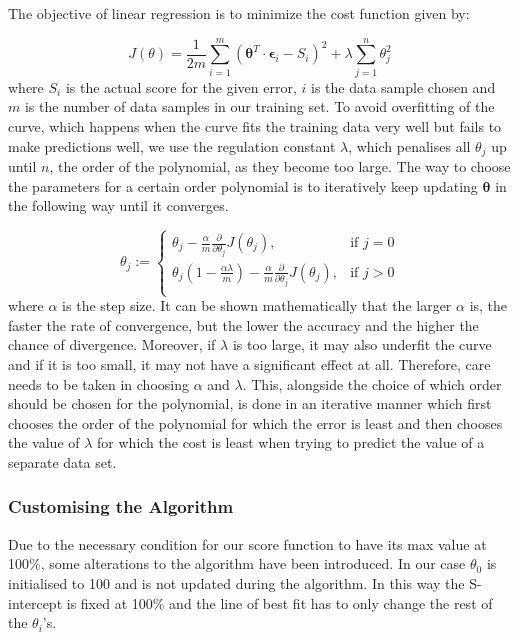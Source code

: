 \documentclass[11pt,a4paper]{article}
\begin{document}
\noindent
The objective of linear regression is to minimize the cost function given by:

\begin{equation}
J(\theta) = \frac{1}{2m} \sum_{i=1}^m \left( \boldsymbol \theta^T \cdot \boldsymbol \epsilon_i - S_i\right)^2  + \lambda \sum_{j=1}^n \theta_j^2
\end{equation} 
where $S_i$ is the actual score for the given error, $i$ is the data sample chosen and $m$ is the number of data samples in our training set. To avoid overfitting of the curve, which happens when the curve fits the training data very well but fails to make predictions well, we use the regulation constant $\lambda$, which penalises all $\theta_j$ up until $n$, the order of the polynomial, as they become too large. The way to choose the parameters for a certain order polynomial is to iteratively keep updating $\boldsymbol \theta$ in the following way until it converges.

\begin{equation}
  \theta_j :=
\begin{cases}
\theta_j  - \frac{\alpha}{m} \frac{\partial}{\partial \theta_j } J( \theta_j), & \text{if }j = 0 \\
\theta_j \left(1- \frac{\alpha\lambda}{m} \right) - \frac{\alpha}{m} \frac{\partial}{\partial \theta_j } J( \theta_j), & \text{if }j > 0 \\
\end{cases}
\end{equation} 
where $\alpha$ is the step size. It can be shown mathematically that the larger $\alpha$ is, the faster the rate of convergence, but the lower the accuracy and the higher the chance of divergence. Moreover, if $\lambda$ is too large, it may also underfit the curve and if it is too small, it may not have a significant effect at all. Therefore, care needs to be taken in choosing $\alpha$ and $\lambda$. This, alongside the choice of which order should be chosen for the polynomial, is done in an iterative manner which first chooses the order of the polynomial for which the error is least and then chooses the value of $\lambda$ for which the cost is least when trying to predict the value of a separate data set. 

\subsubsection{Customising the Algorithm}
\noindent
Due to the necessary condition for our score function to have its max value at 100\%, some alterations to the algorithm have been introduced. In our case $\theta_0$ is initialised to 100 and is not updated during the algorithm. In this way the S-intercept is fixed at 100\% and the line of best fit has to only change the rest of the $\theta_i$'s. 
\end{document}
